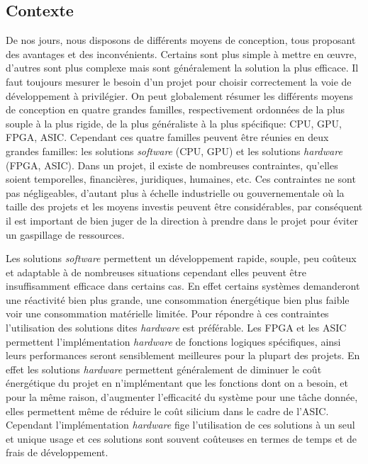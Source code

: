\documentclass[a4paper,12pt]{article}
\begin{document}
\subsection{Contexte}
De nos jours, nous disposons de différents moyens de conception, tous proposant des avantages et des inconvénients. Certains sont plus simple à mettre en œuvre, d'autres sont plus complexe mais sont généralement la solution la plus efficace. Il faut toujours mesurer le besoin d'un projet pour choisir correctement la voie de développement à privilégier.
On peut globalement résumer les différents moyens de conception en quatre grandes familles, respectivement ordonnées de la plus souple à la plus rigide, de la plus généraliste à la plus spécifique: CPU, GPU, FPGA, ASIC. Cependant ces quatre familles peuvent être réunies en deux grandes familles: les solutions \textit{software} (CPU, GPU) et les solutions \textit{hardware} (FPGA, ASIC).
Dans un projet, il existe de nombreuses contraintes, qu'elles soient temporelles, financières, juridiques, humaines, etc. Ces contraintes ne sont pas négligeables, d'autant plus à échelle industrielle ou gouvernementale où la taille des projets et les moyens investis peuvent être considérables, par conséquent il est important de bien juger de la direction à prendre dans le projet pour éviter un gaspillage de ressources. \newline

Les solutions \textit{software} permettent un développement rapide, souple, peu coûteux et adaptable à de nombreuses situations cependant elles peuvent être insuffisamment efficace dans certains cas. En effet certains systèmes demanderont une réactivité bien plus grande, une consommation énergétique bien plus faible voir une consommation matérielle limitée. Pour répondre à ces contraintes l'utilisation des solutions dites \textit{hardware} est préférable. Les FPGA et les ASIC permettent l'implémentation \textit{hardware} de fonctions logiques spécifiques, ainsi leurs performances seront sensiblement meilleures pour la plupart des projets. En effet les solutions \textit{hardware} permettent généralement de diminuer le coût énergétique du projet en n'implémentant que les fonctions dont on a besoin, et pour la même raison, d'augmenter l'efficacité du système pour une tâche donnée, elles permettent même de réduire le coût silicium dans le cadre de l'ASIC. Cependant l'implémentation \textit{hardware} fige l'utilisation de ces solutions à un seul et unique usage et ces solutions sont souvent coûteuses en termes de temps et de frais de développement.\newline
\end{document}
